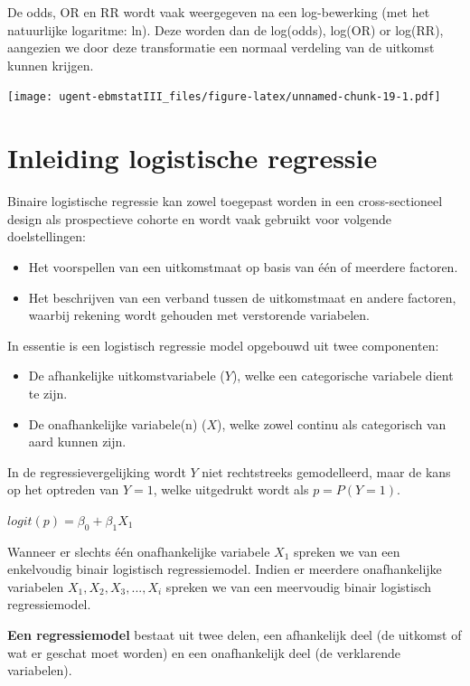 \documentclass[
]{book}
\providecommand{\tightlist}{%
  \setlength{\itemsep}{0pt}\setlength{\parskip}{0pt}}
\theoremstyle{definition}
\theoremstyle{definition}
\theoremstyle{definition}
\theoremstyle{definition}
\theoremstyle{remark}
\begin{document}
De odds, OR en RR wordt vaak weergegeven na een log-bewerking (met het natuurlijke logaritme: ln). Deze worden dan de log(odds), log(OR) or log(RR), aangezien we door deze transformatie een normaal verdeling van de uitkomst kunnen krijgen.

\texttt{[image: ugent-ebmstatIII\_files/figure-latex/unnamed-chunk-19-1.pdf]}

\hypertarget{inleiding-logistische-regressie}{%
\section*{Inleiding logistische regressie}\label{inleiding-logistische-regressie}}


Binaire logistische regressie kan zowel toegepast worden in een cross-sectioneel design als prospectieve cohorte en wordt vaak gebruikt voor volgende doelstellingen:

\begin{itemize}
\tightlist
\item
  Het voorspellen van een uitkomstmaat op basis van één of meerdere factoren.
\item
  Het beschrijven van een verband tussen de uitkomstmaat en andere factoren, waarbij rekening wordt gehouden met verstorende variabelen.
\end{itemize}

In essentie is een logistisch regressie model opgebouwd uit twee componenten:

\begin{itemize}
\tightlist
\item
  De afhankelijke uitkomstvariabele (\(Y\)), welke een categorische variabele dient te zijn.
\item
  De onafhankelijke variabele(n) (\(X\)), welke zowel continu als categorisch van aard kunnen zijn.
\end{itemize}

In de regressievergelijking wordt \(Y\) niet rechtstreeks gemodelleerd, maar de kans op het optreden van \(Y = 1\), welke uitgedrukt wordt als \(p = P(Y=1)\).

\(logit(p) = \beta_0 + \beta_1 X_1\)

Wanneer er slechts één onafhankelijke variabele \(X_1\) spreken we van een enkelvoudig binair logistisch regressiemodel. Indien er meerdere onafhankelijke variabelen \(X_1, X_2, X_3,..., X_i\) spreken we van een meervoudig binair logistisch regressiemodel.

\textbf{Een regressiemodel} bestaat uit twee delen, een afhankelijk deel (de uitkomst of wat er geschat moet worden) en een onafhankelijk deel (de verklarende variabelen).
\end{document}
